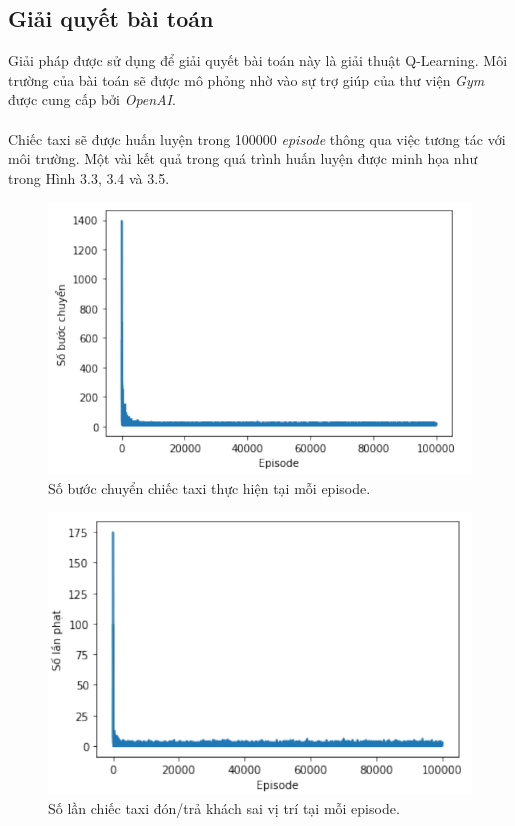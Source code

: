 \documentclass[12pt,a4paper]{report}
\begin{document}
\subsection{Giải quyết bài toán}
Giải pháp được sử dụng để giải quyết bài toán này là giải thuật Q-Learning. Môi trường
của bài toán sẽ được mô phỏng nhờ vào sự trợ giúp của thư viện \textit{Gym} được cung cấp bởi
\textit{OpenAI}.
\\\\Chiếc taxi sẽ được huấn luyện trong 100000 \textit{episode} thông qua việc tương tác với môi
trường. Một vài kết quả trong quá trình huấn luyện được minh họa như trong Hình 3.3, 3.4
và 3.5.
\begin{figure}[h]
	\centering
	\includegraphics[scale=.6]{9}
	\caption{Số bước chuyển chiếc taxi thực hiện tại mỗi episode.}
\end{figure}
\begin{figure}[h]
	\centering
	\includegraphics[scale=.6]{10}
	\caption{Số lần chiếc taxi đón/trả khách sai vị trí tại mỗi episode.}
\end{figure}
\end{document}
